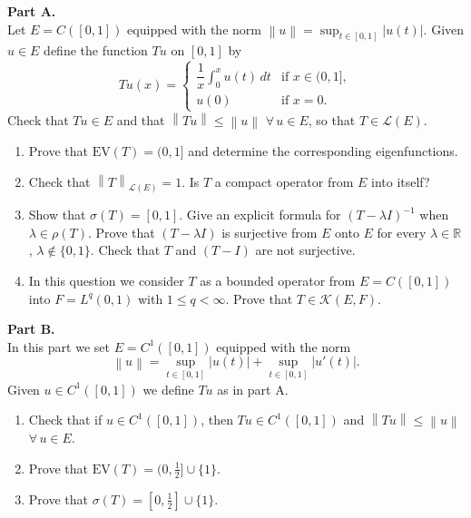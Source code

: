 \documentclass[12pt]{article}
\newcommand{\norm}[1]{\left\|#1\right\|}
\newcommand{\abs}[1]{\left|#1\right|}
\newcommand{\R}{\mathbb{R}}
\begin{document}
\medskip
 
\noindent\textbf{Part A.}\\
Let $E = C([0,1])$ equipped with the norm $\norm{u} = \sup_{t \in [0,1]}\abs{u(t)}$.
Given $u \in E$ define the function $Tu$ on $[0,1]$ by
\[
Tu(x) =
\begin{cases}
\dfrac{1}{x}\displaystyle\int_0^x u(t)\,dt & \text{if } x \in (0,1],\\[8pt]
u(0) & \text{if } x = 0.
\end{cases}
\]
Check that $Tu \in E$ and that $\norm{Tu} \le \norm{u}$ $\forall\, u \in E$, so that $T \in \mathcal{L}(E)$.
 
\begin{enumerate}
\item Prove that $\mathrm{EV}(T) = (0,1]$ and determine the corresponding eigenfunctions.
 
\item Check that $\norm{T}_{\mathcal{L}(E)} = 1$. Is $T$ a compact operator from $E$ into itself?
 
\item Show that $\sigma(T) = [0,1]$. Give an explicit formula for $(T - \lambda I)^{-1}$ when
$\lambda \in \rho(T)$. Prove that $(T - \lambda I)$ is surjective from $E$ onto $E$ for every
$\lambda \in \R$, $\lambda \notin \{0,1\}$. Check that $T$ and $(T - I)$ are not surjective.
 
\item In this question we consider $T$ as a bounded operator from $E = C([0,1])$ into
$F = L^q(0,1)$ with $1 \le q < \infty$. Prove that $T \in \mathcal{K}(E,F)$.
 
\noindent[\textit{Hint:} Consider the operator $(T_\varepsilon u)(x) = \dfrac{1}{x+\varepsilon}\int_0^x u(t)\,dt$ with
$\varepsilon > 0$ and estimate $\norm{T_\varepsilon - T}_{\mathcal{L}(E,F)}$ as $\varepsilon \to 0$.]
\end{enumerate}
 
\noindent\textbf{Part B.}\\
In this part we set $E = C^1([0,1])$ equipped with the norm
\[
\norm{u} = \sup_{t \in [0,1]}\abs{u(t)} + \sup_{t \in [0,1]}\abs{u'(t)}.
\]
Given $u \in C^1([0,1])$ we define $Tu$ as in part A.
 
\begin{enumerate}
\item Check that if $u \in C^1([0,1])$, then $Tu \in C^1([0,1])$ and $\norm{Tu} \le \norm{u}$
$\forall\, u \in E$.
 
\item Prove that $\mathrm{EV}(T) = (0, \tfrac{1}{2}] \cup \{1\}$.
 
\item Prove that $\sigma(T) = [0, \tfrac{1}{2}] \cup \{1\}$.
\end{enumerate}
 
\end{document}
